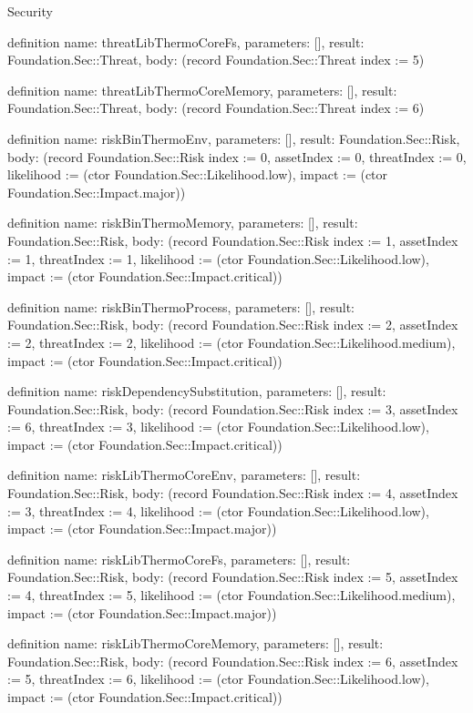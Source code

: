 \begin{lexlean}{Security}
\begin{semanticmodule}
definition{
  name: threatLibThermoCoreFs,
  parameters: [],
  result: Foundation.Sec::Threat,
  body: (record Foundation.Sec::Threat {index := 5})
}

definition{
  name: threatLibThermoCoreMemory,
  parameters: [],
  result: Foundation.Sec::Threat,
  body: (record Foundation.Sec::Threat {index := 6})
}

definition{
  name: riskBinThermoEnv,
  parameters: [],
  result: Foundation.Sec::Risk,
  body: (record Foundation.Sec::Risk {index := 0, assetIndex := 0, threatIndex := 0, likelihood := (ctor Foundation.Sec::Likelihood.low), impact := (ctor Foundation.Sec::Impact.major)})
}

definition{
  name: riskBinThermoMemory,
  parameters: [],
  result: Foundation.Sec::Risk,
  body: (record Foundation.Sec::Risk {index := 1, assetIndex := 1, threatIndex := 1, likelihood := (ctor Foundation.Sec::Likelihood.low), impact := (ctor Foundation.Sec::Impact.critical)})
}

definition{
  name: riskBinThermoProcess,
  parameters: [],
  result: Foundation.Sec::Risk,
  body: (record Foundation.Sec::Risk {index := 2, assetIndex := 2, threatIndex := 2, likelihood := (ctor Foundation.Sec::Likelihood.medium), impact := (ctor Foundation.Sec::Impact.critical)})
}

definition{
  name: riskDependencySubstitution,
  parameters: [],
  result: Foundation.Sec::Risk,
  body: (record Foundation.Sec::Risk {index := 3, assetIndex := 6, threatIndex := 3, likelihood := (ctor Foundation.Sec::Likelihood.low), impact := (ctor Foundation.Sec::Impact.critical)})
}

definition{
  name: riskLibThermoCoreEnv,
  parameters: [],
  result: Foundation.Sec::Risk,
  body: (record Foundation.Sec::Risk {index := 4, assetIndex := 3, threatIndex := 4, likelihood := (ctor Foundation.Sec::Likelihood.low), impact := (ctor Foundation.Sec::Impact.major)})
}

definition{
  name: riskLibThermoCoreFs,
  parameters: [],
  result: Foundation.Sec::Risk,
  body: (record Foundation.Sec::Risk {index := 5, assetIndex := 4, threatIndex := 5, likelihood := (ctor Foundation.Sec::Likelihood.medium), impact := (ctor Foundation.Sec::Impact.major)})
}

definition{
  name: riskLibThermoCoreMemory,
  parameters: [],
  result: Foundation.Sec::Risk,
  body: (record Foundation.Sec::Risk {index := 6, assetIndex := 5, threatIndex := 6, likelihood := (ctor Foundation.Sec::Likelihood.low), impact := (ctor Foundation.Sec::Impact.critical)})
}


\end{semanticmodule}
\end{lexlean}
